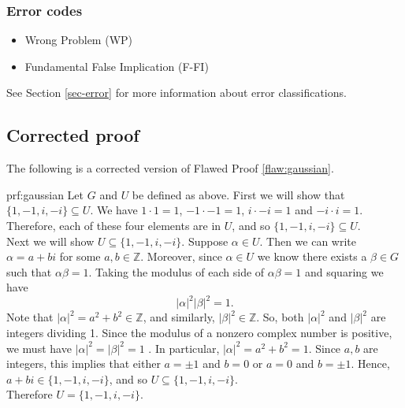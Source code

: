 \subsubsection{Error codes}
\begin{itemize}
    \item Wrong Problem (WP)
	\item Fundamental False Implication (F-FI)
\end{itemize}
See Section \ref{sec-error} for more information about error classifications.

\clearpage
\subsection{Corrected proof}

The following is a corrected version of Flawed Proof \ref{flaw:gaussian}. %

\begin{prf}{prf:gaussian} %
Let $G$ and $U$ be defined as above.
First we will show that $\{1,-1,i,-i\} \subseteq U$. We have $1\cdot1 = 1$, $-1\cdot -1 = 1$, $i \cdot -i = 1$ and $-i\cdot i = 1$. Therefore, each of these four elements are in $U$, and so $\{1,-1,i,-i\} \subseteq U$. \\


\noindent Next we will show $U \subseteq \{1,-1,i,-i\}$.
Suppose $\alpha \in U$. Then we can write $\alpha = a+bi$ for some $a,b \in \mathbb{Z}$. Moreover, since $\alpha \in U$ we know there exists a $\beta \in G$ such that $\alpha\beta = 1$. Taking the modulus of each side of $\alpha\beta = 1$ and squaring we have
$$|\alpha|^2|\beta|^2 = 1. $$
Note that $|\alpha|^2=a^2+b^2\in\mathbb{Z}$, and similarly, $|\beta|^2\in\mathbb{Z}$. So, both $|\alpha|^2$ and $|\beta|^2$ are integers dividing 1. Since the modulus of a nonzero complex number is positive, we must have $|\alpha|^2=|\beta|^2=1$ . In particular, $|\alpha|^2=a^2+b^2 = 1$. Since $a,b$ are integers, this implies that either $a=\pm1$ and $b=0$ or $a=0$ and $b=\pm1$. Hence, $a+bi \in \{1,-1,i,-i\}$, and so $U \subseteq \{1,-1,i,-i\}$. \\

\noindent Therefore $U = \{1,-1,i,-i\}$.

\end{prf} 